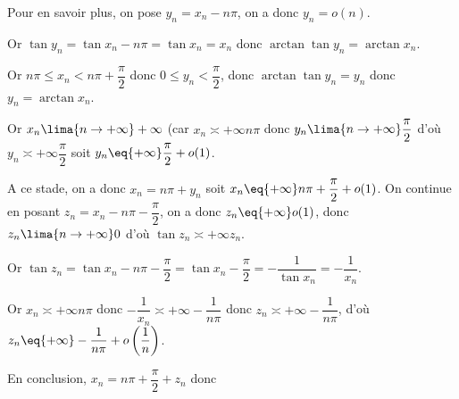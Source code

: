 \documentclass[a4paper,french,bookmarks]{article}
\begin{document}
\begin{enumerate}
{\begin{enumerate}
        Pour en savoir plus, on pose $y_n = x_n - n\pi$, on a donc $y_n = o(n)$.
        
        Or $\tan{y_n} = \tan{x_n - n\pi} = \tan{x_n} = x_n$ donc $\arctan{\tan{y_n}} = \arctan{x_n}$.
        
        Or $n\pi \leq x_n < n\pi + \dfrac{\pi}{2}$ donc $0 \leq y_n < \dfrac{\pi}{2}$, donc $\arctan{\tan{y_n}} = y_n$ donc $y_n = \arctan{x_n}$.
        
        Or $x_n \lima{n \to +\infty} +\infty$ (car $x_n \asymp{+\infty} n\pi$ donc $y_n \lima{n \to +\infty} \dfrac{\pi}{2}$ d'où $y_n \asymp{+\infty} \dfrac{\pi}{2}$ soit $y_n \eq{+\infty} \dfrac{\pi}{2} + o(1)$.
        
        A ce stade, on a donc $x_n = n\pi + y_n$ soit $x_n \eq{+\infty} n\pi + \dfrac{\pi}{2} + o(1)$.
        On continue en posant $z_n = x_n - n\pi - \dfrac{\pi}{2}$, on a donc $z_n \eq{+\infty} o(1)$, donc $z_n \lima{n \to +\infty} 0$ d'où $\tan{z_n} \asymp{+\infty} z_n$.
        
        Or $\tan{z_n} = \tan{x_n - n\pi - \dfrac{\pi}{2}} = \tan{x_n - \dfrac{\pi}{2}} = -\dfrac{1}{\tan{x_n}} = -\dfrac{1}{x_n}$.
        
         Or $x_n \asymp{+\infty} n\pi$ donc $-\dfrac{1}{x_n} \asymp{+\infty} - \dfrac{1}{n\pi}$ donc $z_n \asymp{+\infty} -\dfrac{1}{n\pi}$, d'où $z_n \eq{+\infty} -\dfrac{1}{n\pi} + o\left(\dfrac{1}{n}\right)$.
         
         En conclusion, $x_n = n\pi + \dfrac{\pi}{2} + z_n$ donc 
    \end{enumerate}
    }
    

    
\end{enumerate}
\end{document}
